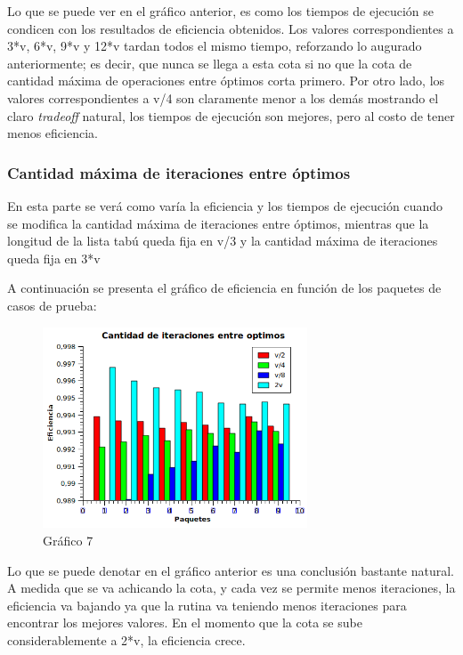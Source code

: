 \documentclass[a4paper,10pt]{article}
\begin{document}
Lo que se puede ver en el gr\'afico anterior, es como los tiempos de ejecuci\'on se condicen con los resultados de eficiencia obtenidos. Los valores correspondientes a 3*v, 6*v, 9*v y 12*v tardan todos el mismo tiempo, reforzando lo augurado anteriormente; es decir, que nunca se llega a esta cota si no que la cota de cantidad m\'axima de operaciones entre \'optimos corta primero. Por otro lado, los valores correspondientes a v/4 son claramente menor a los dem\'as mostrando el claro \emph{tradeoff} natural, los tiempos de ejecuci\'on son mejores, pero al costo de tener menos eficiencia.


\subsubsection*{Cantidad m\'axima de iteraciones entre \'optimos}

En esta parte se ver\'a como var\'ia la eficiencia y los tiempos de ejecuci\'on cuando se modifica la cantidad m\'axima de iteraciones entre \'optimos, mientras que la longitud de la lista tab\'u queda fija en v/3 y la cantidad m\'axima de iteraciones queda fija en 3*v

A continuaci\'on se presenta el gr\'afico de eficiencia en funci\'on de los paquetes de casos de prueba:

\begin{figure}[H]
\centering
\includegraphics[width=0.7\textwidth]{graficos/combo5.png} 
\caption{Gráfico 7}
\end{figure}

Lo que se puede denotar en el gr\'afico anterior es una conclusi\'on bastante natural. A medida que se va achicando la cota, y cada vez se permite menos iteraciones, la eficiencia va bajando ya que la rutina va teniendo menos iteraciones para encontrar los mejores valores. En el momento que la cota se sube considerablemente a 2*v, la eficiencia crece.
\end{document}
